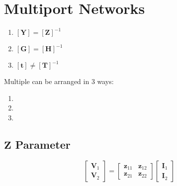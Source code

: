 \section*{Multiport Networks} \label{sec:Multiport Networks}
	\begin{enumerate}
		\item $\left[ \mathbf{Y} \right] = \left[ \mathbf{Z} \right]^{-1}$
		\item $\left[ \mathbf{G} \right] = \left[ \mathbf{H} \right]^{-1}$
		\item $\left[ \mathbf{t} \right] \neq \left[ \mathbf{T} \right]^{-1}$
	\end{enumerate}

Multiple  can be arranged in 3 ways:
	\begin{enumerate}
		\item {}
		\item {}
		\item {}
	\end{enumerate}
	
	\vspace{-4mm}
	\subsection*{$\mathbf{Z}$ Parameter} \label{subsec:Z Parameter}
		\begin{equation*} \label{eq:Z Parameter}
			\begin{bmatrix}
				\mathbf{V}_{1} \\
				\mathbf{V}_{2}
			\end{bmatrix}
			=\begin{bmatrix}
				\mathbf{z}_{11} & \mathbf{z}_{12} \\
				\mathbf{z}_{21} & \mathbf{z}_{22}
			\end{bmatrix}
			\begin{bmatrix}
				\mathbf{I}_{1} \\
				\mathbf{I}_{2}
			\end{bmatrix}
		\end{equation*}
	
	\vspace{-4mm}	
